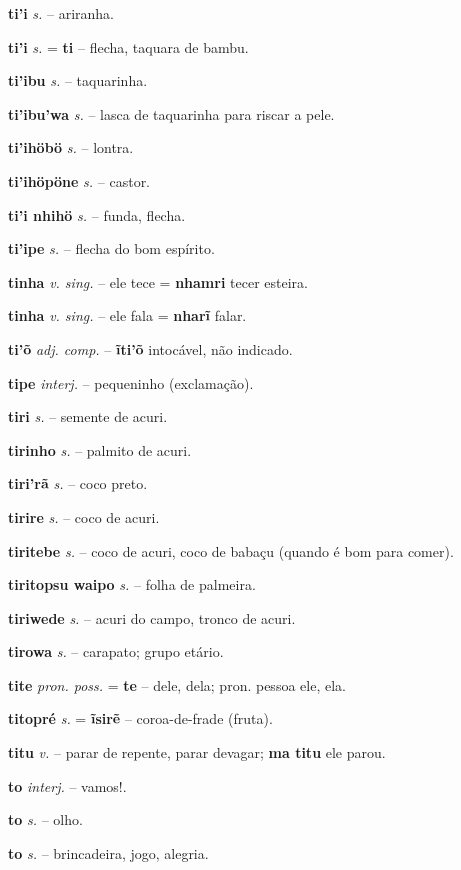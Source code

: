\textbf{ti'i} \textit{s.} -- ariranha.

\textbf{ti'i} \textit{s.} = \textbf{ti} -- flecha, taquara de bambu.

\textbf{ti'ibu} \textit{s.} -- taquarinha.

\textbf{ti'ibu'wa} \textit{s.} -- lasca de taquarinha para riscar a pele.

\textbf{ti'ihöbö} \textit{s.} -- lontra.

\textbf{ti'ihöpöne} \textit{s.} -- castor.

\textbf{ti'i nhihö} \textit{s.} -- funda, flecha.

\textbf{ti'ipe} \textit{s.} -- flecha do bom espírito.

\textbf{tinha} \textit{v. sing.} -- ele tece = \textbf{nhamri} tecer esteira.

\textbf{tinha} \textit{v. sing.} -- ele fala = \textbf{nharĩ} falar.

\textbf{ti'õ} \textit{adj. comp.} -- \textbf{ĩti'õ} intocável, não indicado.

\textbf{tipe} \textit{interj.} -- pequeninho (exclamação).

\textbf{tiri} \textit{s.} -- semente de acuri.

\textbf{tirinho} \textit{s.} -- palmito de acuri.

\textbf{tiri'rã} \textit{s.} -- coco preto.

\textbf{tirire} \textit{s.} -- coco de acuri.

\textbf{tiritebe} \textit{s.} -- coco de acuri, coco de babaçu (quando é bom para comer).

\textbf{tiritopsu waipo} \textit{s.} -- folha de palmeira.

\textbf{tiriwede} \textit{s.} -- acuri do campo, tronco de acuri.

\textbf{tirowa} \textit{s.} -- carapato; grupo etário.

\textbf{tite} \textit{pron. poss.} = \textbf{te} -- dele, dela; pron. pessoa ele, ela.

\textbf{titopré} \textit{s.} = \textbf{ĩsirẽ} -- coroa-de-frade (fruta).

\textbf{titu} \textit{v.} -- parar de repente, parar devagar; \textbf{ma titu} ele parou.

\textbf{to} \textit{interj.} -- vamos!.

\textbf{to} \textit{s.} -- olho.

\textbf{to} \textit{s.} -- brincadeira, jogo, alegria.

